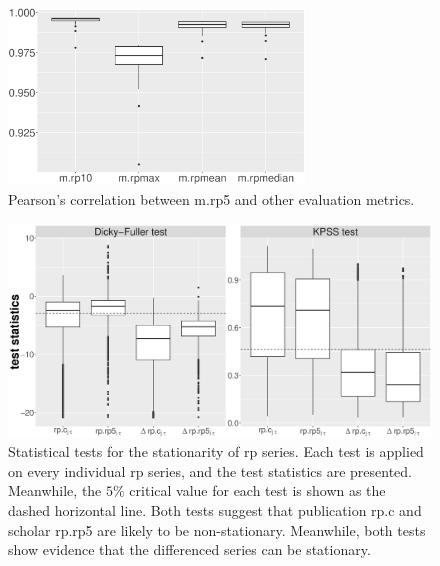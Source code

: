 \begin{refsection}
\begin{figure}[ht!]
    \centering
    \includegraphics[width=0.7\textwidth]{figures/robustness_test/cor.eps}
    \caption{Pearson's correlation between m.rp5 and other evaluation metrics.}
    \label{fig:robustness_test_cor}
\end{figure}


\begin{figure}[ht!]
    \centering
    \includegraphics[width=\textwidth]{figures/stationarity_test/drift.eps}
    \caption{Statistical tests for the stationarity of rp series. Each test is applied on every individual rp series, and the test statistics are presented. Meanwhile, the $5 \%$ critical value for each test is shown as the dashed horizontal line. Both tests suggest that publication rp.c and scholar rp.rp5 are likely to be non-stationary. Meanwhile, both tests show evidence that the differenced series can be stationary. }
    \label{fig:stationarity_test}
\end{figure}


\end{refsection}
